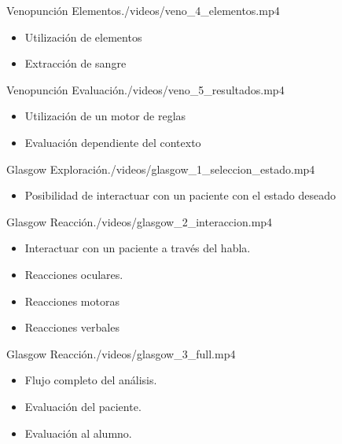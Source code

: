 \begin{step}{Venopunción Elementos}{./videos/veno_4_elementos.mp4}
\begin{itemize}
    \item Utilización de elementos
    \item Extracción de sangre
\end{itemize}
\end{step}


\begin{step}{Venopunción Evaluación}{./videos/veno_5_resultados.mp4}
\begin{itemize}
    \item Utilización de un motor de reglas
    \item Evaluación dependiente del contexto
\end{itemize}
\end{step}


\begin{step}{Glasgow Exploración}{./videos/glasgow_1_seleccion_estado.mp4}
\begin{itemize}
    \item Posibilidad de interactuar con un paciente con el estado deseado
\end{itemize}
\end{step}

\begin{step}{Glasgow Reacción}{./videos/glasgow_2_interaccion.mp4}
\begin{itemize}
    \item Interactuar con un paciente a través del habla.
    \item Reacciones oculares.
    \item Reacciones motoras
    \item Reacciones verbales
\end{itemize}
\end{step}


\begin{step}{Glasgow Reacción}{./videos/glasgow_3_full.mp4}
\begin{itemize}
    \item Flujo completo del análisis.
    \item Evaluación del paciente.
    \item Evaluación al alumno.
\end{itemize}
\end{step}
